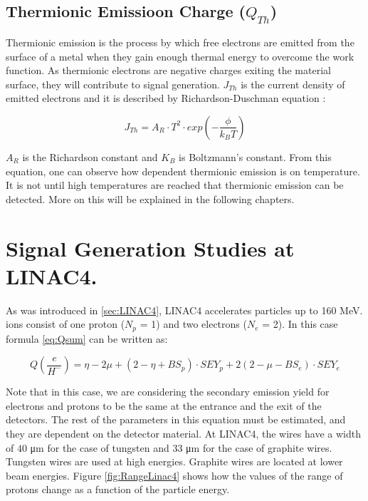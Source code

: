 \subsection{Thermionic Emissioon Charge ($Q_{Th}$)}
\label{sec:ThermoCurrent}

Thermionic emission is the process by which free electrons are emitted from the surface of a metal when they gain enough thermal energy to overcome the work function. As thermionic electrons are negative charges exiting the material surface, they will contribute to signal generation. $J_{Th}$ is the current density of emitted electrons and it is described by Richardson-Duschman equation \parencite[][]{ref:Richardson}:

\begin{equation}
    J_{Th} = A_R \cdot T^2 \cdot exp\left(-\frac{\phi}{k_B T} \right) 
    \label{eq:ThermoCurrent}
\end{equation}

$A_R$ is the Richardson constant and $K_B$ is Boltzmann's constant. From this equation, one can observe how dependent thermionic emission is on temperature. It is not until high temperatures are reached that thermionic emission can be detected. More on this will be explained in the following chapters. 

\section{Signal Generation Studies at LINAC4.}
\label{sec:SignalStudiesL4}

As was introduced in \ref{sec:LINAC4}, LINAC4 accelerates \hm particles up to 160 MeV. \hm ions consist of one proton ($N_p$ = 1) and two electrons ($N_e$ = 2). In this case formula \ref{eq:Qsum} can be written as: 

\begin{equation}
    Q\left(\frac{e}{H^{-}}\right) = \eta - 2\mu + \left( 2 - \eta + BS_p \right) \cdot SEY_p +2\left( 2 - \mu - BS_e \right) \cdot SEY_e
    \label{eq:Ql4}
\end{equation}

Note that in this case, we are considering the secondary emission yield for electrons and protons to be the same at the entrance and the exit of the detectors. The rest of the parameters in this equation must be estimated, and they are dependent on the detector material. At LINAC4, the wires have a width of $40$ \si{\micro\metre} for the case of tungsten and 33 \si{\micro \metre} for the case of graphite wires.  Tungsten wires are used at high energies. Graphite wires are located at lower beam energies. Figure \ref{fig:RangeLinac4} shows how the values of the range of protons change as a function of the particle energy. 

